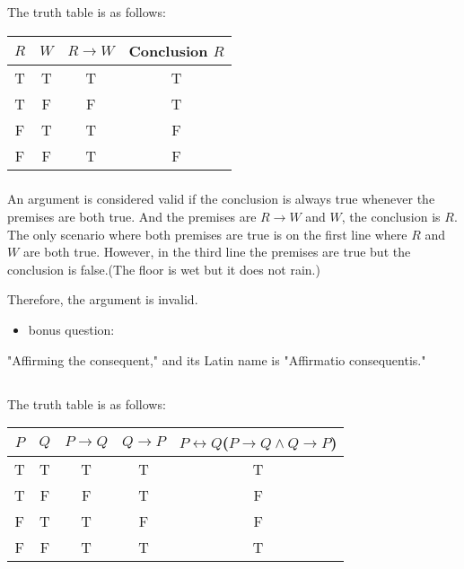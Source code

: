 \documentclass[UTF8,a4paper,AutoFakeBold,AutoFakeSlant]{article}
\begin{document}
\subsubsection{}
The truth table is as follows:
\begin{table}[H]
\centering
\begin{tabular}{|c|c|c|c|}
\hline
$R$ & $W$ & $R \rightarrow W$ & Conclusion $R$ \\ \hline
T   & T   & T                 & T              \\ \hline
T   & F   & F                 & T              \\ \hline
F   & T   & T                 & F              \\ \hline
F   & F   & T                 & F              \\ \hline
\end{tabular}
\end{table}

\subsubsection{}
An argument is considered valid if the conclusion is always true whenever the premises are both true.
And the premises are $R \rightarrow W$ and $W$, the conclusion is $R$.
The only scenario where both premises are true is on the first line where $R$ and $W$ are both true.
However, in the third line the premises are true but the conclusion is false.(The floor is wet but it does not rain.)

Therefore, the argument is invalid.

\begin{itemize}
    \item bonus question:
\end{itemize}

"Affirming the consequent," and its Latin name is "Affirmatio consequentis."


\subsection{}
The truth table is as follows:
\begin{table}[H]
\centering
\begin{tabular}{|c|c|c|c|c|}
\hline
$P$ & $Q$ & $P \rightarrow Q$ & $Q \rightarrow P$ &$P \leftrightarrow Q$($P \rightarrow Q \land Q \rightarrow P$)  \\ \hline
T   & T   & T                 & T &T                       \\ \hline
T   & F   & F                 & T &F                       \\ \hline
F   & T   & T                 & F &F                       \\ \hline
F   & F   & T                 & T &T                       \\ \hline
\end{tabular}
\end{table}
\end{document}
